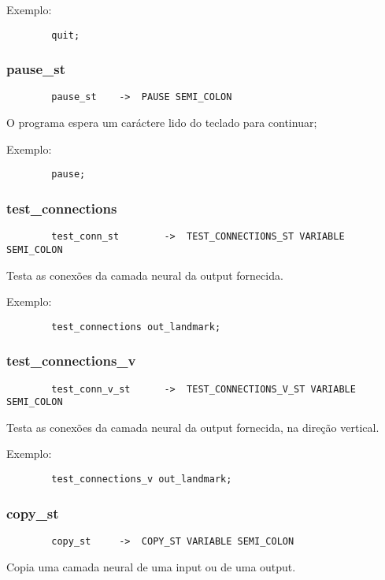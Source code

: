 \documentclass[a4paper,10pt]{article}
\begin{document}
		Exemplo:
		\begin{lstlisting}
		quit;
		\end{lstlisting}
		\vspace{10mm}
	\subsubsection{pause\_st}
		\begin{lstlisting}
		pause_st	->	PAUSE SEMI_COLON
		\end{lstlisting}
		O programa espera um car\'actere lido do teclado para continuar;
		
		Exemplo:
		\begin{lstlisting}
		pause;
		\end{lstlisting}
		\vspace{10mm}
	\subsubsection{test\_connections}
		\begin{lstlisting}
		test_conn_st		->	TEST_CONNECTIONS_ST VARIABLE SEMI_COLON
		\end{lstlisting}
		Testa as conex\~oes da camada neural da output fornecida.
		
		Exemplo:
		\begin{lstlisting}
		test_connections out_landmark;
		\end{lstlisting}
		\vspace{10mm}
	\subsubsection{test\_connections\_v}
		\begin{lstlisting}
		test_conn_v_st		->	TEST_CONNECTIONS_V_ST VARIABLE SEMI_COLON
		\end{lstlisting}
		Testa as conex\~oes da camada neural da output fornecida, na dire\c{c}\~ao vertical.
		
		Exemplo:
		\begin{lstlisting}
		test_connections_v out_landmark;
		\end{lstlisting}
		\vspace{10mm}
	\subsubsection{copy\_st}
		\begin{lstlisting}
		copy_st		->	COPY_ST VARIABLE SEMI_COLON
		\end{lstlisting}
		Copia uma camada neural de uma input ou de uma output.
		
\end{document}
